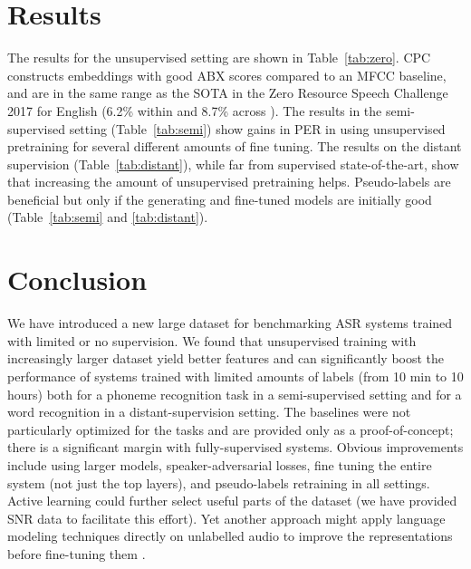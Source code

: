 \documentclass{article}
\begin{document}
\vspace{-8pt}
\section{Results}
\label{sec:typestyle}
\vspace{-5pt}
The results for the unsupervised setting are shown in Table~\ref{tab:zero}. CPC constructs embeddings with good ABX scores compared to an MFCC baseline, and are in the same range as the SOTA in the Zero Resource Speech Challenge 2017 for English (6.2\% within and 8.7\% across \cite{heck2017}). The results in the semi-supervised setting (Table~\ref{tab:semi}) show gains in PER in using unsupervised pretraining for several different amounts of fine tuning. The results on the distant supervision (Table~\ref{tab:distant}), while far from supervised state-of-the-art, show that increasing the amount of unsupervised pretraining helps. Pseudo-labels are beneficial but only if the generating and fine-tuned models are initially good (Table~\ref{tab:semi} and \ref{tab:distant}).



\vspace{-8pt}
\section{Conclusion}
\label{sec:conc}
\vspace{-5pt}
We have introduced a new large dataset for benchmarking ASR systems trained with limited or no supervision. We found that unsupervised training with increasingly larger dataset yield better features and can significantly boost the performance of systems trained with limited amounts of labels (from 10 min to 10 hours) both for a phoneme recognition task in a semi-supervised setting and for a word recognition in a distant-supervision setting. The baselines were not particularly optimized for the tasks and are provided only as a proof-of-concept; there is a significant margin with fully-supervised systems. Obvious improvements include using larger models, speaker-adversarial losses, fine tuning the entire system (not just the top layers), and pseudo-labels retraining in all settings. Active learning \cite{hakkani2002active} could further select useful parts of the dataset (we have provided SNR data to facilitate this effort). Yet another approach might apply language modeling techniques directly on unlabelled audio to improve the representations before fine-tuning them \cite{chung2018speech2vec,anonymous2020vqwavvec}. 
\end{document}
